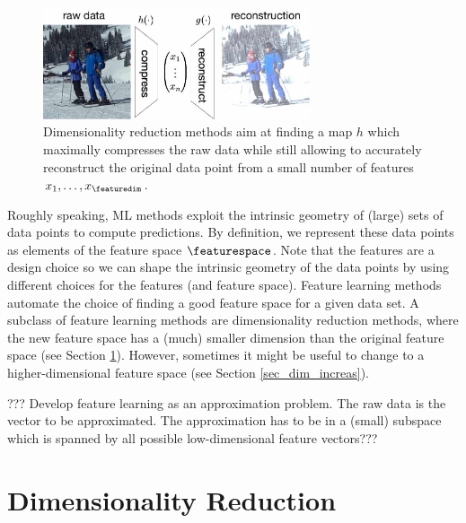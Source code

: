 \documentclass[12pt]{report}
\begin{document}
\begin{figure}[htbp]
\begin{center}
\includegraphics[width=0.7\textwidth]{DimRed.jpg}  
\end{center}
\caption{Dimensionality reduction methods aim at finding a map $h$ which maximally 
	compresses the raw data while still allowing to accurately reconstruct the original 
	data point from a small number of features $x_{1},\ldots,x_{\featuredim}$.}
\label{fig_dimred}
\end{figure}



Roughly speaking, ML methods exploit the intrinsic geometry of (large) sets of 
data points to compute predictions. By definition, we represent these data points 
as elements of the feature space $\featurespace$. Note that the features are 
a design choice so we can shape the intrinsic geometry of the data points by 
using different choices for the features (and feature space). Feature learning 
methods automate the choice of finding a good feature space for a given 
data set. A subclass of feature learning methods are dimensionality reduction methods, 
where the new feature space has a (much) smaller dimension than the original 
feature space (see Section \ref{sec_dim_red}). However, sometimes it might be 
useful to change to a higher-dimensional feature space (see Section \ref{sec_dim_increas}). 


??? Develop feature learning as an approximation problem. The raw data 
is the vector to be approximated. The approximation has to be in a (small) 
subspace which is spanned by all possible low-dimensional feature vectors???

\section{Dimensionality Reduction} 
\label{sec_dim_red}
\end{document}
